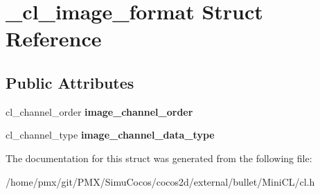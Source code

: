 \hypertarget{struct__cl__image__format}{}\section{\+\_\+cl\+\_\+image\+\_\+format Struct Reference}
\label{struct__cl__image__format}
\subsection*{Public Attributes}
\begin{DoxyCompactItemize}
\item 
\mbox{\label{struct__cl__image__format_aaedf0bf00bd2b217e865cad706bfad02}} 
cl\+\_\+channel\+\_\+order {\bfseries image\+\_\+channel\+\_\+order}
\item 
\mbox{\label{struct__cl__image__format_ae965ba5f74cd52eabffc4e0904adea34}} 
cl\+\_\+channel\+\_\+type {\bfseries image\+\_\+channel\+\_\+data\+\_\+type}
\end{DoxyCompactItemize}


The documentation for this struct was generated from the following file\+:\begin{DoxyCompactItemize}
\item 
/home/pmx/git/\+P\+M\+X/\+Simu\+Cocos/cocos2d/external/bullet/\+Mini\+C\+L/cl.\+h\end{DoxyCompactItemize}
